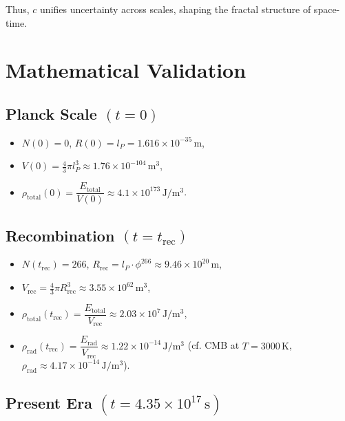 \documentclass[12pt,a4paper]{article}
\begin{document}
Thus, \(c\) unifies uncertainty across scales, shaping the fractal structure of space-time.

\section{Mathematical Validation}

\subsection{Planck Scale \texorpdfstring{\((t=0)\)}{(t=0)}}

\begin{itemize}
  \item \(N(0) = 0\), \(R(0) = l_P = 1.616 \times 10^{-35}\,\mathrm{m}\),
  \item \(V(0) = \frac{4}{3}\pi l_P^3 \approx 1.76 \times 10^{-104}\,\mathrm{m^3}\),
  \item \(\rho_{\mathrm{total}}(0) = \dfrac{E_{\mathrm{total}}}{V(0)} \approx 4.1 \times 10^{173}\,\mathrm{J/m^3}\).
\end{itemize}

\subsection{Recombination \texorpdfstring{\((t=t_{\mathrm{rec}})\)}{(t=trec)}}

\begin{itemize}
  \item \(N(t_{\mathrm{rec}}) = 266\), \(R_{\mathrm{rec}} = l_P \cdot \phi^{266} \approx 9.46 \times 10^{20}\,\mathrm{m}\),
  \item \(V_{\mathrm{rec}} = \frac{4}{3}\pi R_{\mathrm{rec}}^3 \approx 3.55 \times 10^{62}\,\mathrm{m^3}\),
  \item \(\rho_{\mathrm{total}}(t_{\mathrm{rec}}) = \dfrac{E_{\mathrm{total}}}{V_{\mathrm{rec}}} \approx 2.03 \times 10^7\,\mathrm{J/m^3}\),
  \item \(\rho_{\mathrm{rad}}(t_{\mathrm{rec}}) = \dfrac{E_{\mathrm{rad}}}{V_{\mathrm{rec}}} \approx 1.22 \times 10^{-14}\,\mathrm{J/m^3}\) (cf. CMB at \(T = 3000\,\mathrm{K}\), \(\rho_{\mathrm{rad}} \approx 4.17 \times 10^{-14}\,\mathrm{J/m^3}\)).
\end{itemize}

\subsection{Present Era \texorpdfstring{\((t=4.35 \times 10^{17}\,\mathrm{s})\)}{(t=4.35e17 s)}}
\end{document}
